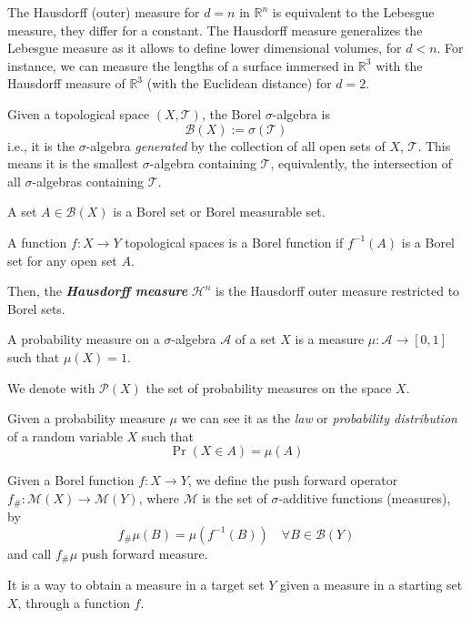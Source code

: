 \documentclass[a4paper,12pt,reqno]{amsbook}
\theoremstyle{definition} %
\newcommand{\1}{\mathbbm{1}}
\newcommand{\mH}{\mathscr{H}}
\newcommand{\mP}{\mathscr{P}}
\newcommand{\cT}{\mathcal{T}} %
\newcommand{\R}{\ensuremath{\mathbb{R}}}
\theoremstyle{plain}
\theoremstyle{remark}
\begin{document}
The Hausdorff (outer) measure for $d=n$ in $\R^n$ is equivalent to the Lebesgue measure, they differ for a constant. The Hausdorff measure generalizes the Lebesgue measure as it allows to define lower dimensional volumes, for $d<n$. For instance, we can measure the lengths of a surface immersed in $\R^3$ with the Hausdorff measure of $\R^3$ (with the Euclidean distance) for $d=2$. 

\begin{definition}
    Given a topological space $(X,\cT)$, the Borel $\sigma$-algebra is 
    \[
    \mathscr{B}(X):= \sigma(\cT)
    \]
    i.e., it is the $\sigma$-algebra \textit{generated} by the collection of all open sets of $X$,  $\mathcal{T}$. This means it is the smallest $\sigma$-algebra containing  $\mathcal{T}$, equivalently, the intersection of all $\sigma$-algebras containing  $\mathcal{T}$.
\end{definition}

\begin{definition}
    A set $A\in\mathscr{B}(X)$ is a Borel set or Borel measurable set.
\end{definition}

\begin{definition}
    A function $f: X \to Y$ topological spaces is a Borel function if $f^{-1}(A)$ is a Borel set for any open set $A$. 
\end{definition}

Then, the \textbf{\emph{Hausdorff measure}} $\mH^n$ is the Hausdorff outer measure restricted to Borel sets. 
\\

\begin{definition}
    A probability measure on a $\sigma$-algebra $\mathcal{A}$ of a set $X$ is a measure $\mu:\mathcal{A}\to [0,1]$ such that $\mu(X)=1$.
\end{definition}

We denote with $\mP(X)$ the set of probability measures on the space $X$. 

Given a probability measure $\mu$ we can see it as the \textit{law} or \textit{probability distribution} of a random variable $X$ such that 
\[
\Pr(X \in A) = \mu(A)
\]

\begin{definition}
    Given a Borel function $f:X \to Y$, we define the push forward operator $f_\#: \mathscr{M}(X) \to \mathscr{M}(Y)$, where $\mathscr{M}$ is the set of $\sigma$-additive functions (measures), by
    \[
    f_\#\mu(B) = \mu(f^{-1}(B)) \quad \forall B \in \mathscr{B}(Y)
    \]
    and call $f_\#\mu$ push forward measure.
\end{definition}
It is a way to obtain a measure in a target set $Y$ given a measure in a starting set $X$, through a function $f$. 
\end{document}
